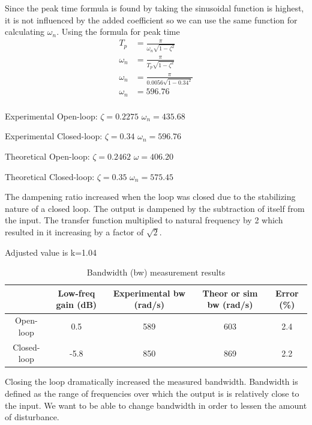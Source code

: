 \documentclass{article}
\begin{document}
Since the peak time formula is found by taking the sinusoidal function is highest, it is not influenced by the added coefficient so we can use the same function for calculating $\omega_n$.
Using the formula for peak time
\begin{align*}
    T_p &= \frac{\pi}{\omega_n\sqrt{1-\zeta^2}}\\
    \omega_n &= \frac{\pi}{T_p\sqrt{1-\zeta^2}}\\
    \omega_n &= \frac{\pi}{0.0056\sqrt{1-0.34^2}}\\
    \omega_n &= 596.76\\
\end{align*}


Experimental Open-loop: $\zeta = 0.2275$ $\omega_n = 435.68$

Experimental Closed-loop: $\zeta = 0.34$ $\omega_n = 596.76$

Theoretical Open-loop: $\zeta = 0.2462$ $\omega = 406.20$

Theoretical Closed-loop: $\zeta = 0.35$ $\omega_n = 575.45$

The dampening ratio increased when the loop was closed due to the stabilizing nature of a closed loop. The output is dampened by the subtraction of itself from the input. The transfer function multiplied to natural frequency by 2 which resulted in it increasing by a factor of $\sqrt{2}$.


Adjusted value is k=1.04

\begin{table}[!htbp]
\centering
    \begin{tabular}{|c|c|c|c|c|}
        \hline
        & Low-freq gain (dB) & Experimental bw (rad/s) & Theor or sim bw (rad/s) & Error (\%)\\
        \hline
        Open-loop & 0.5 & 589 & 603 & 2.4\\
        \hline
        Closed-loop & -5.8 & 850 & 869 & 2.2\\
        \hline
    \end{tabular}
    \caption{Bandwidth (bw) measurement results}
\end{table}
Closing the loop dramatically increased the measured bandwidth. Bandwidth is defined as the range of frequencies over which the output is is relatively close to the input. We want to be able to change bandwidth in order to lessen the amount of disturbance.
\end{document}
